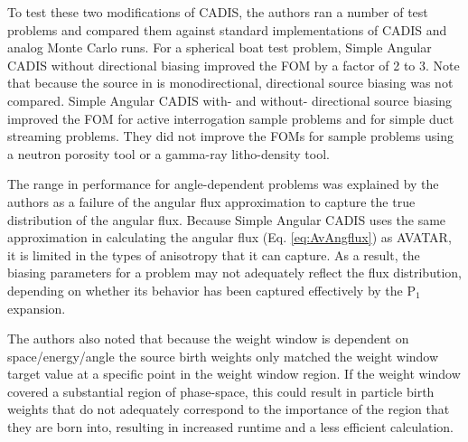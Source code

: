 To test these two modifications of CADIS, the authors ran a number of test
problems and
compared them against standard implementations of CADIS and analog Monte Carlo
runs. For a spherical boat test problem, Simple Angular CADIS without
directional biasing improved the FOM by a factor of 2 to 3. Note that because
the source in is monodirectional, directional source biasing was not compared.
Simple Angular CADIS with- and without- directional source biasing improved the
FOM for active interrogation sample problems and for simple duct streaming
problems. They did not improve the FOMs for sample problems using a neutron
porosity tool or a gamma-ray litho-density tool.

The range in performance for
angle-dependent problems was explained by the authors as a failure of the
angular flux approximation to capture the true distribution of the angular flux.
Because Simple Angular CADIS uses the same approximation in calculating the
angular flux (Eq. \eqref{eq:AvAngflux}) as AVATAR, it is limited in the types of anisotropy
that it can capture. As a result, the biasing parameters for a problem may not
adequately reflect the flux distribution, depending on whether its behavior has
been captured effectively by the P$_1$ expansion.

The authors also noted that because the weight window is dependent on
space/energy/angle the source birth weights only matched
the weight window target value at a specific point in the weight window region.
If the weight window covered a substantial region of phase-space, this could
result in particle birth weights that do not adequately correspond to the
importance of the region that they are born into, resulting in increased runtime
and a less efficient calculation.

